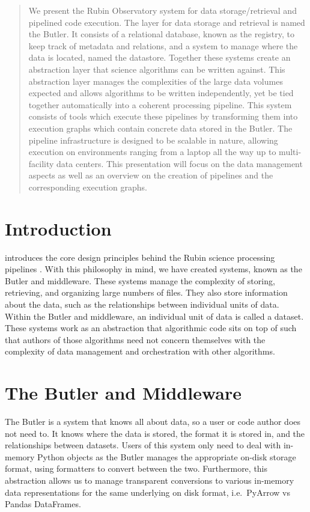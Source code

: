 \documentclass[11pt,twoside]{article}
\begin{document}
\begin{abstract}
    We present the Rubin Observatory system for data storage/retrieval and pipelined code execution. The layer for data storage and retrieval is named the Butler. It consists of a relational database, known as the registry, to keep track of metadata and relations, and a system to manage where the data is located, named the datastore. Together these systems create an abstraction layer that science algorithms can be written against. This abstraction layer manages the complexities of the large data volumes expected and allows algorithms to be written independently, yet be tied together automatically into a coherent processing pipeline. This system consists of tools which execute these pipelines by transforming them into execution graphs which contain concrete data stored in the Butler. The pipeline infrastructure is designed to be scalable in nature, allowing execution on environments ranging from a laptop all the way up to multi-facility data centers. This presentation will focus on the data management aspects as well as an overview on the creation of pipelines and the corresponding execution graphs.
\end{abstract}

\section{Introduction}

\citet{I08_adassxxxii} introduces the core design principles behind the Rubin science processing pipelines \citep{2019ApJ...873..111I}. With this philosophy in mind, we have created systems, known as the Butler and middleware. These systems manage the complexity of storing, retrieving, and organizing large numbers of files. They also store information about the data, such as the relationships between individual units of data. Within the Butler and middleware, an individual unit of data is called a dataset. These systems work as an abstraction that algorithmic code sits on top of such that authors of those algorithms need not concern themselves with the complexity of data management and orchestration with other algorithms.

\section{The Butler and Middleware}
The Butler is a system that knows all about data, so a user or code author does not need to. It knows where the data is stored, the format it is stored in, and the relationships between datasets. Users of this system only need to deal with in-memory Python objects as the Butler manages the appropriate on-disk storage format, using formatters to convert between the two. Furthermore, this abstraction allows us to manage transparent conversions to various in-memory data representations for the same underlying on disk format, i.e.\ PyArrow vs Pandas DataFrames.
\end{document}
